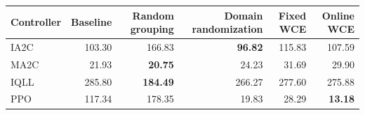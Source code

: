 \begin{tabular}{lrrrrr}
\hline
Controller & Baseline & Random grouping & Domain randomization & Fixed WCE & Online WCE \\
\hline
IA2C & 103.30 & 166.83 & \textbf{96.82} & 115.83 & 107.59 \\
MA2C & 21.93 & \textbf{20.75} & 24.23 & 31.69 & 29.90 \\
IQLL & 285.80 & \textbf{184.49} & 266.27 & 277.60 & 275.88 \\
PPO & 117.34 & 178.35 & 19.83 & 28.29 & \textbf{13.18} \\
\hline
\end{tabular}

